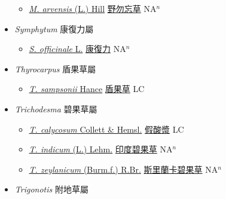 \begin{itemize}
  \begin{itemize}
        \item[] \href{http://www.theplantlist.org/tpl1.1/search?q=Myosotis+arvensis}{\textit{M. arvensis} (L.) Hill}   \href{\detokenize{http://taibnet.sinica.edu.tw/chi/taibnet_species_list.php?T2=野勿忘草&T2_new_value=true&fr=y}}{野勿忘草} NA$^n$
  \end{itemize}
 \item[] \textit{Symphytum} 康復力屬
                    
  \begin{itemize}
        \item[] \href{http://www.theplantlist.org/tpl1.1/search?q=Symphytum+officinale}{\textit{S. officinale} L.}   \href{\detokenize{http://taibnet.sinica.edu.tw/chi/taibnet_species_list.php?T2=康復力&T2_new_value=true&fr=y}}{康復力} NA$^n$
  \end{itemize}
 \item[] \textit{Thyrocarpus} 盾果草屬
                    
  \begin{itemize}
        \item[] \href{http://www.theplantlist.org/tpl1.1/search?q=Thyrocarpus+sampsonii}{\textit{T. sampsonii} Hance}   \href{\detokenize{http://taibnet.sinica.edu.tw/chi/taibnet_species_list.php?T2=盾果草&T2_new_value=true&fr=y}}{盾果草} LC
  \end{itemize}
 \item[] \textit{Trichodesma} 碧果草屬
                    
  \begin{itemize}
        \item[] \href{http://www.theplantlist.org/tpl1.1/search?q=Trichodesma+calycosum}{\textit{T. calycosum} Collett \& Hemsl.}   \href{\detokenize{http://taibnet.sinica.edu.tw/chi/taibnet_species_list.php?T2=假酸漿&T2_new_value=true&fr=y}}{假酸漿} LC
        \item[] \href{http://www.theplantlist.org/tpl1.1/search?q=Trichodesma+indicum}{\textit{T. indicum} (L.) Lehm.}   \href{\detokenize{http://taibnet.sinica.edu.tw/chi/taibnet_species_list.php?T2=印度碧果草&T2_new_value=true&fr=y}}{印度碧果草} NA$^n$
        \item[] \href{http://www.theplantlist.org/tpl1.1/search?q=Trichodesma+zeylanicum}{\textit{T. zeylanicum} (Burm.f.) R.Br.}   \href{\detokenize{http://taibnet.sinica.edu.tw/chi/taibnet_species_list.php?T2=斯里蘭卡碧果草&T2_new_value=true&fr=y}}{斯里蘭卡碧果草} NA$^n$
  \end{itemize}
 \item[] \textit{Trigonotis} 附地草屬
                    

\end{itemize}
